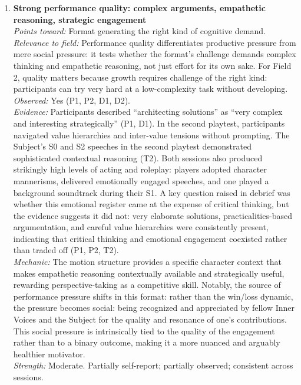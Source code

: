 \documentclass[12pt]{article}
\begin{document}
\begin{enumerate}
\item \textbf{Strong performance quality: complex arguments, empathetic reasoning, strategic engagement}\\
\textit{Points toward:} Format generating the right kind of cognitive demand.\\
\textit{Relevance to field:} Performance quality differentiates productive pressure from mere social pressure: it tests whether the format's challenge demands complex thinking and empathetic reasoning, not just effort for its own sake. For Field 2, quality matters because growth requires challenge of the right kind: participants can try very hard at a low-complexity task without developing.\\
\textit{Observed:} Yes (P1, P2, D1, D2).\\
\textit{Evidence:} Participants described ``architecting solutions'' as ``very complex and interesting strategically'' (P1, D1). In the second playtest, participants navigated value hierarchies and inter-value tensions without prompting. The Subject's S0 and S2 speeches in the second playtest demonstrated sophisticated contextual reasoning (T2). Both sessions also produced strikingly high levels of acting and roleplay: players adopted character mannerisms, delivered emotionally engaged speeches, and one played a background soundtrack during their S1. A key question raised in debrief was whether this emotional register came at the expense of critical thinking, but the evidence suggests it did not: very elaborate solutions, practicalities-based argumentation, and careful value hierarchies were consistently present, indicating that critical thinking and emotional engagement coexisted rather than traded off (P1, P2, T2).\\
\textit{Mechanic:} The motion structure provides a specific character context that makes empathetic reasoning contextually available and strategically useful, rewarding perspective-taking as a competitive skill. Notably, the source of performance pressure shifts in this format: rather than the win/loss dynamic, the pressure becomes social: being recognized and appreciated by fellow Inner Voices and the Subject for the quality and resonance of one's contributions. This social pressure is intrinsically tied to the quality of the engagement rather than to a binary outcome, making it a more nuanced and arguably healthier motivator.\\
\textit{Strength:} Moderate. Partially self-report; partially observed; consistent across sessions.


\end{enumerate}
\end{document}
